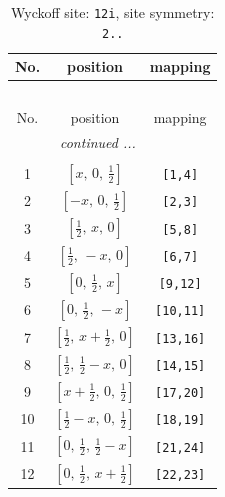 \documentclass[fleqn,8pt]{jsarticle}
\begin{document}
\begin{longtable}{ccc}
\caption{Wyckoff site: {\tt 12i}, site symmetry: {\tt 2..}}
 \\
 \hline \hline
No. & position & mapping \\ \hline \endfirsthead

\multicolumn{2}{l}{\tablename\ \thetable{}} \\
 \hline \hline
No. & position & mapping \\ \hline \endhead

 \hline \hline
\multicolumn{2}{r}{\footnotesize\it continued ...} \\ \endfoot

 \hline \hline
\multicolumn{2}{r}{} \\ \endlastfoot

1 & $\left[ x,\, 0,\, \frac{1}{2} \right]$ & {\tt [1,4]} \\ \hline
2 & $\left[ - x,\, 0,\, \frac{1}{2} \right]$ & {\tt [2,3]} \\ \hline
3 & $\left[ \frac{1}{2},\, x,\, 0 \right]$ & {\tt [5,8]} \\ \hline
4 & $\left[ \frac{1}{2},\, - x,\, 0 \right]$ & {\tt [6,7]} \\ \hline
5 & $\left[ 0,\, \frac{1}{2},\, x \right]$ & {\tt [9,12]} \\ \hline
6 & $\left[ 0,\, \frac{1}{2},\, - x \right]$ & {\tt [10,11]} \\ \hline
7 & $\left[ \frac{1}{2},\, x + \frac{1}{2},\, 0 \right]$ & {\tt [13,16]} \\ \hline
8 & $\left[ \frac{1}{2},\, \frac{1}{2} - x,\, 0 \right]$ & {\tt [14,15]} \\ \hline
9 & $\left[ x + \frac{1}{2},\, 0,\, \frac{1}{2} \right]$ & {\tt [17,20]} \\ \hline
10 & $\left[ \frac{1}{2} - x,\, 0,\, \frac{1}{2} \right]$ & {\tt [18,19]} \\ \hline
11 & $\left[ 0,\, \frac{1}{2},\, \frac{1}{2} - x \right]$ & {\tt [21,24]} \\ \hline
12 & $\left[ 0,\, \frac{1}{2},\, x + \frac{1}{2} \right]$ & {\tt [22,23]} \\
\end{longtable}
\renewcommand{\arraystretch}{1.2}
\end{document}
